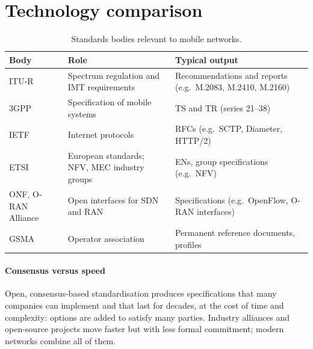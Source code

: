 \documentclass[11pt,a4paper]{article}
\begin{document}
\section{Technology comparison}
\begin{table}[htbp]
\centering\small
\caption{Standards bodies relevant to mobile networks.}\label{tab:bodies}
\begin{tabularx}{\linewidth}{@{}l Y Y@{}}
\toprule
{}Body & Role & Typical output \\
\midrule
ITU-R  & Spectrum regulation and IMT requirements      & Recommendations and reports (e.g.\ M.2083, M.2410, M.2160) \\
3GPP   & Specification of mobile systems               & TS and TR (series 21--38) \\
IETF   & Internet protocols                            & RFCs (e.g.\ SCTP, Diameter, HTTP/2) \\
ETSI   & European standards; NFV, MEC industry groups  & ENs, group specifications (e.g.\ NFV) \\
ONF, O-RAN Alliance & Open interfaces for SDN and RAN  & Specifications (e.g.\ OpenFlow, O-RAN interfaces) \\
GSMA   & Operator association                          & Permanent reference documents, profiles \\
\bottomrule
\end{tabularx}
\end{table}

\paragraph{Consensus versus speed} Open, consensus-based standardisation produces specifications that many companies
can implement and that last for decades, at the cost of time and complexity: options are added to satisfy many
parties. Industry alliances and open-source projects move faster but with less formal commitment; modern
networks combine all of them.

\end{document}
